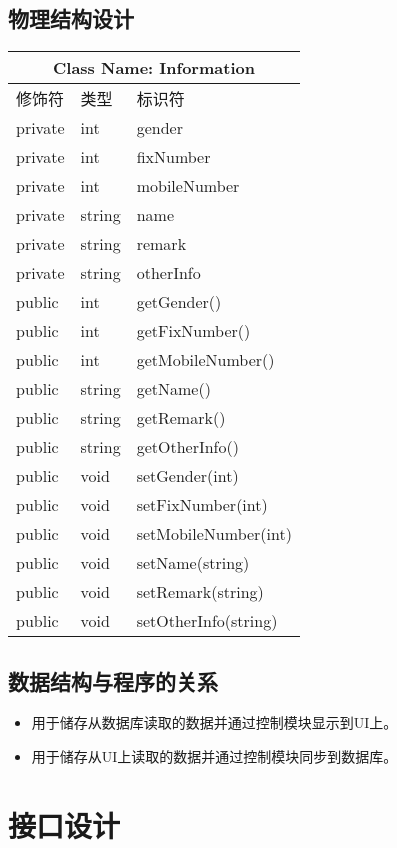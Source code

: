 	\subsection{物理结构设计}
		\begin{tabular}{|l|l|l|}
			\hline
			\multicolumn{3}{|c|}{Class Name: Information} \\
			\hline
			修饰符 & 类型 & 标识符 \\
			\hline
			private & int & gender \\
			private & int & fixNumber \\
			private & int & mobileNumber \\
			private & string & name \\
			private & string & remark \\
			private & string & otherInfo \\
			\hline
			public & int & getGender() \\
			public & int & getFixNumber() \\
			public & int & getMobileNumber() \\
			public & string & getName() \\
			public & string & getRemark() \\
			public & string & getOtherInfo() \\
			public & void & setGender(int) \\
			public & void & setFixNumber(int) \\
			public & void & setMobileNumber(int) \\
			public & void & setName(string) \\
			public & void & setRemark(string) \\
			public & void & setOtherInfo(string) \\
			\hline
		\end{tabular}
	\subsection{数据结构与程序的关系}
		\begin{itemize}
			\item 用于储存从数据库读取的数据并通过控制模块显示到UI上。
			\item 用于储存从UI上读取的数据并通过控制模块同步到数据库。
	\end{itemize}
\section{接口设计}

